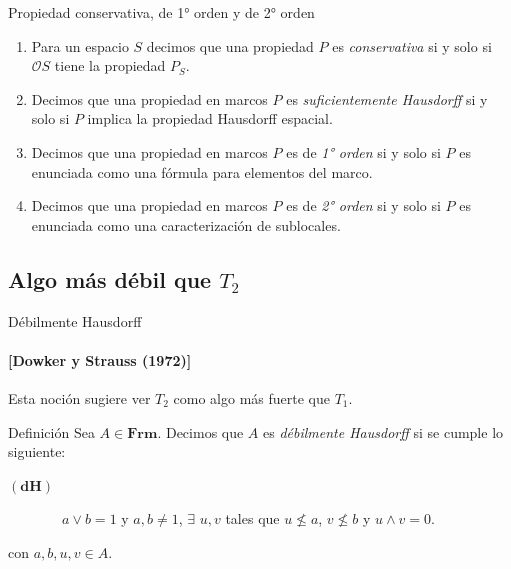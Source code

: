 \documentclass[compress,12pt]{beamer}
\begin{document}
\begin{frame}{Propiedad conservativa, de 1° orden y de 2° orden}

\begin{definition}
    \begin{enumerate}
        \item Para un espacio $S$ decimos que una propiedad $P$ es \emph{conservativa} si y solo si $\mathcal{O}S$ tiene la propiedad $P_S$.

        \item<2-> Decimos que una propiedad en marcos $P$ es \emph{suficientemente Hausdorff} si y solo si $P$ implica la propiedad Hausdorff espacial.
        
        \item<3-> Decimos que una propiedad en marcos $P$ es de \emph{1° orden} si y solo si $P$ es enunciada como una fórmula para elementos del marco.

        \item<4-> Decimos que una propiedad en marcos $P$ es de \emph{2° orden} si y solo si $P$ es enunciada como una caracterización de sublocales.
    \end{enumerate}
\end{definition}

\end{frame}

\subsection{Algo más débil que $T_2$}
\begin{frame}{Débilmente Hausdorff}
\framesubtitle{[Dowker y Strauss (1972)]}
    Esta noción sugiere ver $T_2$ como algo más fuerte que $T_1$.\\

    \begin{block}{Definición}
        Sea $A\in \mathbf{Frm}$. Decimos que $A$ es \emph{débilmente Hausdorff} si se cumple lo siguiente:
        \begin{description}
            \item[$(\mathbf{dH})$] $\quad a\vee b=1$ y $a, b\neq 1$, $\exists$ $u, v$ tales que $u\nleq a$, $v\nleq b$ y $u\wedge v=0$.  
        \end{description}
        con $a, b, u, v\in A$.
    \end{block}

\end{frame}
\end{document}
